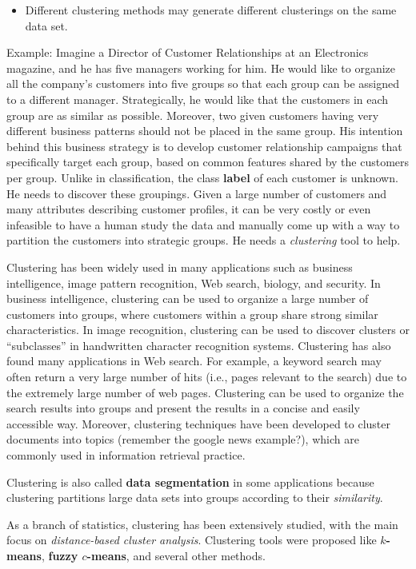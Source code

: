 \documentclass[]{book}
\newenvironment{rmdblock}[1]
  {\begin{shaded*}
  \begin{itemize}
  \renewcommand{\labelitemi}{
    \raisebox{-.7\height}[0pt][0pt]{
      {\setkeys{Gin}{width=2em,keepaspectratio}\texttt{[image: img/icons/\#1]}}
    }
  }
  \item
  }
  {
  \end{itemize}
  \end{shaded*}
  }
\newenvironment{rmdinsight}
  {\begin{rmdblock}{insight}}
  {\end{rmdblock}}
\theoremstyle{definition}
\theoremstyle{definition}
\theoremstyle{definition}
\theoremstyle{remark}
\begin{document}
\begin{rmdinsight}
Different clustering methods may generate different clusterings on the
same data set.
\end{rmdinsight}

Example: Imagine a Director of Customer Relationships at an Electronics
magazine, and he has five managers working for him. He would like to
organize all the company's customers into five groups so that each group
can be assigned to a different manager. Strategically, he would like
that the customers in each group are as similar as possible. Moreover,
two given customers having very different business patterns should not
be placed in the same group. His intention behind this business strategy
is to develop customer relationship campaigns that specifically target
each group, based on common features shared by the customers per group.
Unlike in classification, the class \textbf{label} of each customer is
unknown. He needs to discover these groupings. Given a large number of
customers and many attributes describing customer profiles, it can be
very costly or even infeasible to have a human study the data and
manually come up with a way to partition the customers into strategic
groups. He needs a \emph{clustering} tool to help.

Clustering has been widely used in many applications such as business
intelligence, image pattern recognition, Web search, biology, and
security. In business intelligence, clustering can be used to organize a
large number of customers into groups, where customers within a group
share strong similar characteristics. In image recognition, clustering
can be used to discover clusters or ``subclasses'' in handwritten
character recognition systems. Clustering has also found many
applications in Web search. For example, a keyword search may often
return a very large number of hits (i.e., pages relevant to the search)
due to the extremely large number of web pages. Clustering can be used
to organize the search results into groups and present the results in a
concise and easily accessible way. Moreover, clustering techniques have
been developed to cluster documents into topics (remember the google
news example?), which are commonly used in information retrieval
practice.

Clustering is also called \textbf{data segmentation} in some
applications because clustering partitions large data sets into groups
according to their \emph{similarity}.

As a branch of statistics, clustering has been extensively studied, with
the main focus on \emph{distance-based cluster analysis}. Clustering
tools were proposed like \textbf{\(k\)-means}, \textbf{fuzzy
\(c\)-means}, and several other methods.
\end{document}
